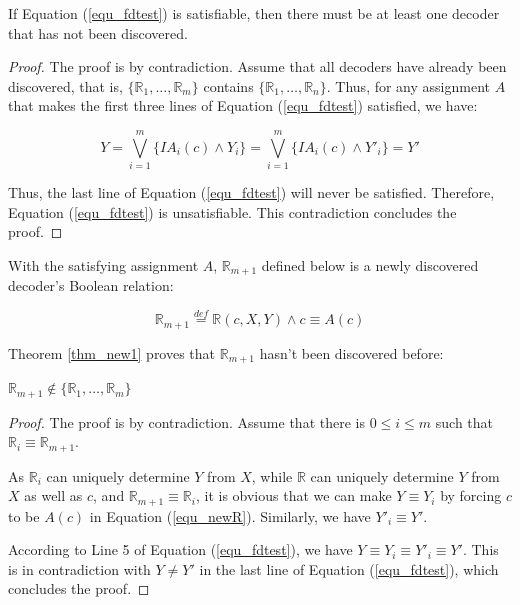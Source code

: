 \documentclass[journal]{IEEEtran}
\begin{document}
\begin{theorem}\label{thm_fdok1}
If Equation (\ref{equ_fdtest}) is satisfiable,
then there must be at least one decoder that has not been discovered.
\end{theorem}
\begin{proof}
The proof is by contradiction.
Assume that all decoders have already been discovered,
that is,
$\{\mathbb{R}_1,\dots,\mathbb{R}_{m}\}$ contains $\{\mathbb{R}_1,\dots,\mathbb{R}_{n}\}$.
Thus,
for any assignment $A$ that makes the first three lines of Equation (\ref{equ_fdtest}) satisfied,
we have:



\begin{equation}\label{equ_fdfrewagain2}
Y=\bigvee _{i=1}^{m} \{IA_i(c)\wedge Y_i\}=\bigvee _{i=1}^{m} \{IA_i(c)\wedge Y'_i\}=Y'
\end{equation}

Thus,
the last line of Equation (\ref{equ_fdtest}) will never be satisfied.
Therefore,
Equation (\ref{equ_fdtest}) is unsatisfiable.
This contradiction concludes the proof.
\end{proof}

With the satisfying assignment $A$,
$\mathbb{R}_{m+1}$ defined below
is a newly discovered decoder's Boolean relation:

\begin{equation}\label{equ_newR}
\mathbb{R}_{m+1}\stackrel{def}{=}\mathbb{R}(c,X,Y)\wedge c\equiv A(c)
\end{equation}

Theorem \ref{thm_new1} proves that $\mathbb{R}_{m+1}$ hasn't been discovered before:

\begin{theorem}\label{thm_new1}
$\mathbb{R}_{m+1}\notin \{\mathbb{R}_1,\dots,\mathbb{R}_m\}$
\end{theorem}
\begin{proof}
The proof is by contradiction.
Assume that there is $0\le i\le m$ such that $\mathbb{R}_i\equiv \mathbb{R}_{m+1}$.

As $\mathbb{R}_i$ can uniquely determine $Y$ from $X$,
while $\mathbb{R}$ can uniquely determine $Y$ from $X$ as well as $c$,
and  $\mathbb{R}_{m+1}\equiv \mathbb{R}_i$,
it is obvious that we can make $Y\equiv Y_i$ by forcing $c$ to be $A(c)$ in Equation (\ref{equ_newR}).
Similarly,
we have $Y'_i\equiv Y'$.

According to Line 5 of Equation (\ref{equ_fdtest}),
we have $Y\equiv Y_i\equiv Y'_i\equiv Y'$.
This is in contradiction with $Y\ne Y'$ in the last line of Equation (\ref{equ_fdtest}),
which concludes the proof.
\end{proof}
\end{document}

